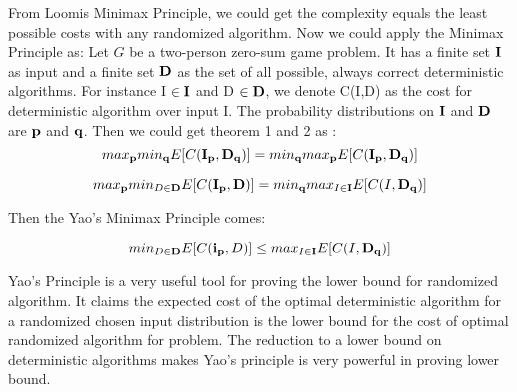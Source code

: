 From Loomis Minimax Principle, we could get the complexity equals the least possible costs with any randomized algorithm. Now we could apply the Minimax Principle as:
Let $G$ be a two-person zero-sum game problem. It has a finite set $\mathbf{I}$ as input and a finite set $\mathbf{D}$ as the set of all possible, always correct deterministic algorithms. For instance I $\in \mathbf{I}$ and D $\in \mathbf{D}$, we denote C(I,D) as the cost for deterministic algorithm over input I. The probability distributions on $\mathbf{I}$ and $\mathbf{D}$ are $\mathbf{p}$ and $\mathbf{q}$. Then we could get theorem 1 and 2 as :
\begin{equation}
   max_{\mathbf{p}}min_{\mathbf{q}}E[C(\mathbf{I}_{\mathbf{p}},\mathbf{D}_{\mathbf{q}})] = min_{\mathbf{q}}max_{\mathbf{p}}E[C(\mathbf{I}_{\mathbf{p}},\mathbf{D}_{\mathbf{q}})]
\end{equation}

\begin{equation}
max_{\mathbf{p}}min_{D\in\mathbf{D}}E[C(\mathbf{I}_{\mathbf{p}},\mathbf{D})] = min_{\mathbf{q}}max_{I\in\mathbf{I}}E[C(I,\mathbf{D}_{\mathbf{q}})]
\end{equation}

Then the Yao's Minimax Principle comes:
\begin{theorem}
	$$min_{D\in\mathbf{D}}E[C(\mathbf{i}_{\mathbf{p}},D)] \le max_{I\in \mathbf{I}}E[C(I,\mathbf{D}_{\mathbf{q}})]$$
\end{theorem}

Yao's Principle is a very useful tool for proving the lower bound for randomized algorithm. It claims the expected cost of the optimal deterministic algorithm for a randomized chosen input distribution is the lower bound for the cost of optimal randomized algorithm for problem. The reduction to a lower bound on deterministic algorithms makes Yao's principle is very powerful in proving lower bound.\cite{YAOS}

